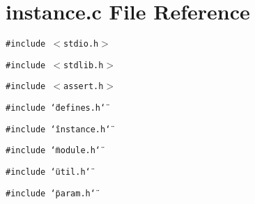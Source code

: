 \section{instance.c File Reference}
\label{instance_8c}
{\tt \#include $<$stdio.h$>$}\par
{\tt \#include $<$stdlib.h$>$}\par
{\tt \#include $<$assert.h$>$}\par
{\tt \#include \char`\"{}defines.h\char`\"{}}\par
{\tt \#include \char`\"{}instance.h\char`\"{}}\par
{\tt \#include \char`\"{}module.h\char`\"{}}\par
{\tt \#include \char`\"{}util.h\char`\"{}}\par
{\tt \#include \char`\"{}param.h\char`\"{}}\par
